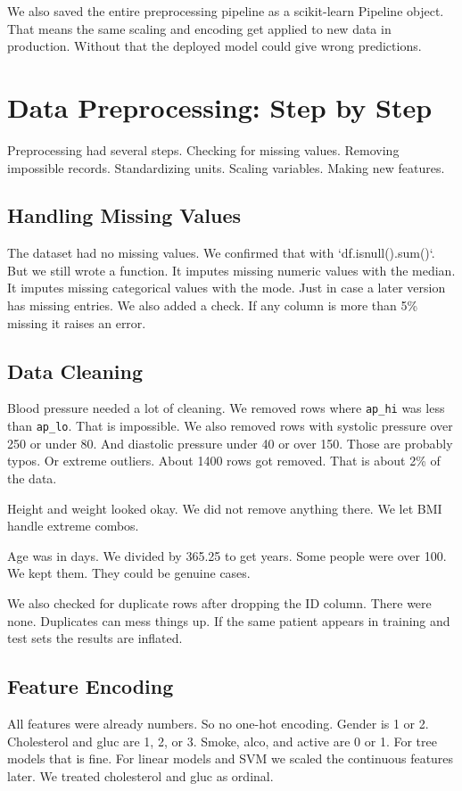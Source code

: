 \documentclass[12pt, a4paper, oneside]{book}
\begin{document}
We also saved the entire preprocessing pipeline as a scikit-learn Pipeline object. That means the same scaling and encoding get applied to new data in production. Without that the deployed model could give wrong predictions.

\section{Data Preprocessing: Step by Step}
Preprocessing had several steps. Checking for missing values. Removing impossible records. Standardizing units. Scaling variables. Making new features.

\subsection{Handling Missing Values}
The dataset had no missing values. We confirmed that with `df.isnull().sum()`. But we still wrote a function. It imputes missing numeric values with the median. It imputes missing categorical values with the mode. Just in case a later version has missing entries. We also added a check. If any column is more than 5\% missing it raises an error.

\subsection{Data Cleaning}
Blood pressure needed a lot of cleaning. We removed rows where \texttt{ap\_hi} was less than \texttt{ap\_lo}. That is impossible. We also removed rows with systolic pressure over 250 or under 80. And diastolic pressure under 40 or over 150. Those are probably typos. Or extreme outliers. About 1400 rows got removed. That is about 2\% of the data.

Height and weight looked okay. We did not remove anything there. We let BMI handle extreme combos.

Age was in days. We divided by 365.25 to get years. Some people were over 100. We kept them. They could be genuine cases.

We also checked for duplicate rows after dropping the ID column. There were none. Duplicates can mess things up. If the same patient appears in training and test sets the results are inflated.

\subsection{Feature Encoding}
All features were already numbers. So no one-hot encoding. Gender is 1 or 2. Cholesterol and gluc are 1, 2, or 3. Smoke, alco, and active are 0 or 1. For tree models that is fine. For linear models and SVM we scaled the continuous features later. We treated cholesterol and gluc as ordinal.
\end{document}
